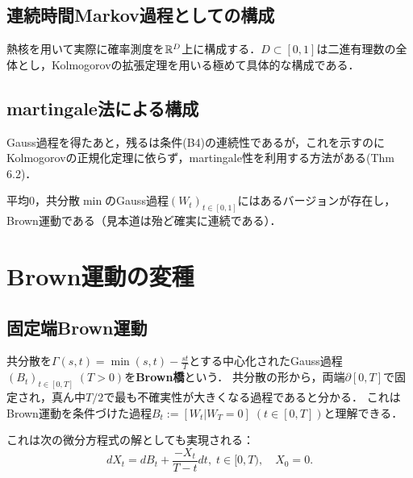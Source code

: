 \documentclass[uplatex,dvipdfmx]{jsreport}
\begin{document}
\subsection{連続時間Markov過程としての構成}

\begin{tcolorbox}[colframe=ForestGreen, colback=ForestGreen!10!white,breakable,colbacktitle=ForestGreen!40!white,coltitle=black,fonttitle=\bfseries\sffamily,
title=]
    熱核を用いて実際に確率測度を$\mathbb{R}^D$上に構成する．$D\subset[0,1]$は二進有理数の全体とし，Kolmogorovの拡張定理を用いる極めて具体的な構成である\cite{舟木}．
\end{tcolorbox}

\subsection{martingale法による構成}

\begin{tcolorbox}[colframe=ForestGreen, colback=ForestGreen!10!white,breakable,colbacktitle=ForestGreen!40!white,coltitle=black,fonttitle=\bfseries\sffamily,
title=]
    Gauss過程を得たあと，残るは条件(B4)の連続性であるが，これを示すのにKolmogorovの正規化定理に依らず，martingale性を利用する方法がある\cite{Bass}(Thm 6.2)．
\end{tcolorbox}


\begin{theorem}[martingaleによる正則化]
    平均$0$，共分散$\min$のGauss過程$(W_t)_{t\in[0,1]}$にはあるバージョンが存在し，Brown運動である（見本道は殆ど確実に連続である）．
\end{theorem}

\section{Brown運動の変種}

\subsection{固定端Brown運動}

\begin{definition}
    共分散を$\Gamma(s,t)=\min(s,t)-\frac{st}{T}$とする中心化されたGauss過程$(B_t)_{t\in[0,T]}\;(T>0)$を\textbf{Brown橋}という．
    共分散の形から，両端$\partial[0,T]$で固定され，真ん中$T/2$で最も不確実性が大きくなる過程であると分かる．
    これはBrown運動を条件づけた過程$B_t:=[W_t|W_T=0]\;(t\in[0,T])$と理解できる．
\end{definition}
\begin{remarks}
    これは次の微分方程式の解としても実現される：
    \[dX_t=dB_t+\frac{-X_t}{T-t}dt,\;t\in[0,T),\quad X_0=0.\]
\end{remarks}
\end{document}
